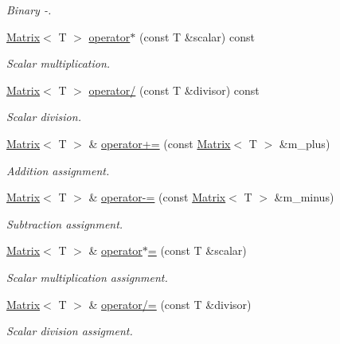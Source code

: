 \begin{DoxyCompactItemize}
\begin{DoxyCompactList}\small\item\em Binary -\/. \end{DoxyCompactList}\item 
\hyperlink{classLuna_1_1Matrix}{Matrix}$<$ T $>$ \hyperlink{classLuna_1_1Matrix_aae7fad5b10fa6bcdcb6bff124afa4149}{operator$\ast$} (const T \&scalar) const
\begin{DoxyCompactList}\small\item\em Scalar multiplication. \end{DoxyCompactList}\item 
\hyperlink{classLuna_1_1Matrix}{Matrix}$<$ T $>$ \hyperlink{classLuna_1_1Matrix_a7300d76f84643395a55a879b6d34bcfd}{operator/} (const T \&divisor) const
\begin{DoxyCompactList}\small\item\em Scalar division. \end{DoxyCompactList}\item 
\hyperlink{classLuna_1_1Matrix}{Matrix}$<$ T $>$ \& \hyperlink{classLuna_1_1Matrix_adb4534f847fcf3d9c6a328210dd7becc}{operator+=} (const \hyperlink{classLuna_1_1Matrix}{Matrix}$<$ T $>$ \&m\+\_\+plus)
\begin{DoxyCompactList}\small\item\em Addition assignment. \end{DoxyCompactList}\item 
\hyperlink{classLuna_1_1Matrix}{Matrix}$<$ T $>$ \& \hyperlink{classLuna_1_1Matrix_a5df4cdac2f9b84bc178dcb3835e26031}{operator-\/=} (const \hyperlink{classLuna_1_1Matrix}{Matrix}$<$ T $>$ \&m\+\_\+minus)
\begin{DoxyCompactList}\small\item\em Subtraction assignment. \end{DoxyCompactList}\item 
\hyperlink{classLuna_1_1Matrix}{Matrix}$<$ T $>$ \& \hyperlink{classLuna_1_1Matrix_af097bbfb48c4d9675faf66bb73f273b3}{operator$\ast$=} (const T \&scalar)
\begin{DoxyCompactList}\small\item\em Scalar multiplication assignment. \end{DoxyCompactList}\item 
\hyperlink{classLuna_1_1Matrix}{Matrix}$<$ T $>$ \& \hyperlink{classLuna_1_1Matrix_a79ce127085c0157012b2d74dbc0b7f7e}{operator/=} (const T \&divisor)
\begin{DoxyCompactList}\small\item\em Scalar division assigment. \end{DoxyCompactList}\item 

\end{DoxyCompactItemize}
